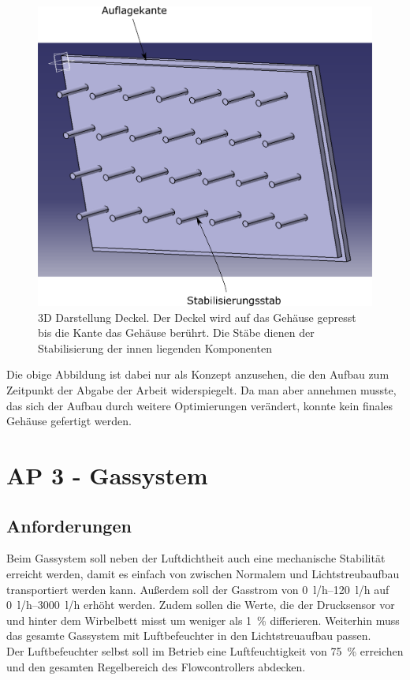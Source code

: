 \begin{figure}[h!]
	\begin{center}
		\includegraphics[scale=0.45]{Elektronik_Gehaeuse1.png}
		\caption[Gehäuse Deckel]{3D Darstellung Deckel. Der Deckel wird auf das Gehäuse gepresst bis die Kante das Gehäuse berührt. Die Stäbe dienen der Stabilisierung der innen liegenden Komponenten}
	\end{center}
\end{figure}

Die obige Abbildung ist dabei nur als Konzept anzusehen, die den Aufbau zum Zeitpunkt der Abgabe der Arbeit widerspiegelt. Da man aber annehmen musste, das sich der Aufbau durch weitere Optimierungen verändert, konnte kein finales Gehäuse gefertigt werden.


\clearpage

\section{AP 3 - Gassystem}

\subsection{Anforderungen}

Beim Gassystem soll neben der Luftdichtheit auch eine mechanische Stabilität erreicht werden, damit es einfach von zwischen Normalem und Lichtstreubaufbau transportiert werden kann. Außerdem soll der Gasstrom von \SIrange{0}{120}{l/h} auf \SIrange{0}{3000}{l/h} erhöht werden. Zudem sollen die Werte, die der Drucksensor vor und hinter dem Wirbelbett misst um weniger als \SI{1}{\%} differieren. Weiterhin muss das gesamte Gassystem mit Luftbefeuchter in den Lichtstreuaufbau passen. \\
Der Luftbefeuchter selbst soll im Betrieb eine Luftfeuchtigkeit von \SI{75}{\%} erreichen und den gesamten Regelbereich des Flowcontrollers abdecken.



